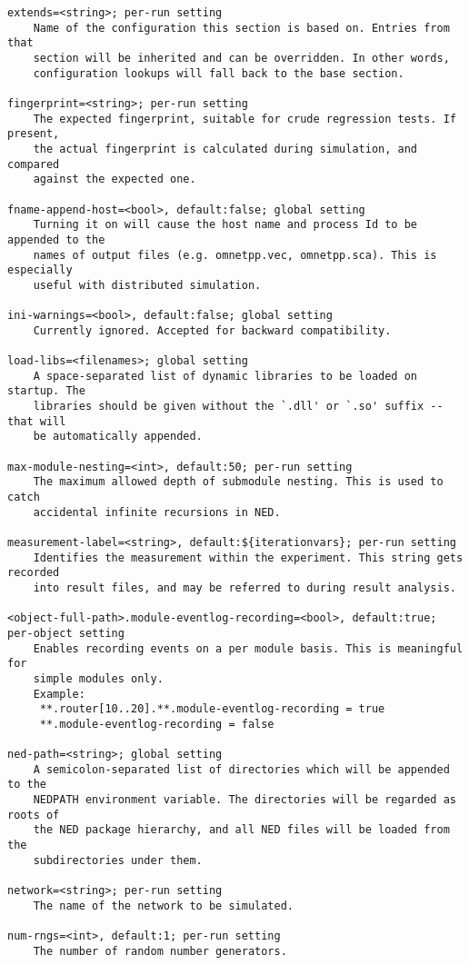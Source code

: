 \begin{verbatim}
extends=<string>; per-run setting
    Name of the configuration this section is based on. Entries from that
    section will be inherited and can be overridden. In other words,
    configuration lookups will fall back to the base section.

fingerprint=<string>; per-run setting
    The expected fingerprint, suitable for crude regression tests. If present,
    the actual fingerprint is calculated during simulation, and compared
    against the expected one.

fname-append-host=<bool>, default:false; global setting
    Turning it on will cause the host name and process Id to be appended to the
    names of output files (e.g. omnetpp.vec, omnetpp.sca). This is especially
    useful with distributed simulation.

ini-warnings=<bool>, default:false; global setting
    Currently ignored. Accepted for backward compatibility.

load-libs=<filenames>; global setting
    A space-separated list of dynamic libraries to be loaded on startup. The
    libraries should be given without the `.dll' or `.so' suffix -- that will
    be automatically appended.

max-module-nesting=<int>, default:50; per-run setting
    The maximum allowed depth of submodule nesting. This is used to catch
    accidental infinite recursions in NED.

measurement-label=<string>, default:${iterationvars}; per-run setting
    Identifies the measurement within the experiment. This string gets recorded
    into result files, and may be referred to during result analysis.

<object-full-path>.module-eventlog-recording=<bool>, default:true; per-object setting
    Enables recording events on a per module basis. This is meaningful for
    simple modules only.
    Example:
     **.router[10..20].**.module-eventlog-recording = true
     **.module-eventlog-recording = false

ned-path=<string>; global setting
    A semicolon-separated list of directories which will be appended to the
    NEDPATH environment variable. The directories will be regarded as roots of
    the NED package hierarchy, and all NED files will be loaded from the
    subdirectories under them.

network=<string>; per-run setting
    The name of the network to be simulated.

num-rngs=<int>, default:1; per-run setting
    The number of random number generators.


\end{verbatim}
